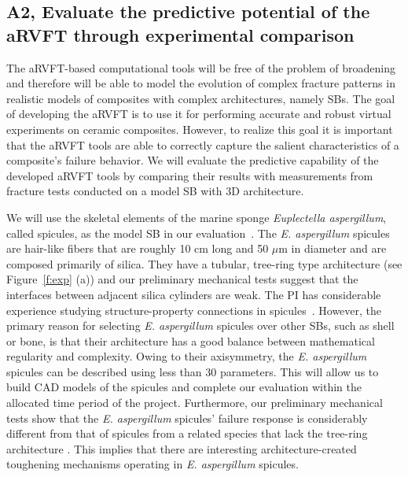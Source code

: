 \documentclass[10pt,letterpaper]{article}
\begin{document}
  \subsection{A2, Evaluate the predictive potential of the aRVFT through experimental comparison}
    \label{s:A2}

    The aRVFT-based computational tools will be free of the problem of broadening and therefore will be able to model the evolution of complex fracture patterns in realistic models of composites with complex architectures, namely SBs.
    The goal of developing the aRVFT is to use it for performing accurate and robust virtual experiments on ceramic composites.
    However, to realize this goal it is important that the aRVFT tools are able to correctly capture the salient characteristics of a composite's failure behavior. We will evaluate the predictive capability of the developed aRVFT tools by comparing their results with measurements from fracture tests conducted on a model SB with 3D architecture.

    We will use the skeletal elements of the marine sponge \textit{Euplectella aspergillum}, called spicules, as the model SB in our evaluation~\cite{mayer2004lessons,sarikaya2001biomimetic}.
    The \textit{E. aspergillum} spicules are hair-like fibers that are roughly 10 cm long and 50 $\mu$m in diameter and are composed primarily of silica.
    They have a tubular, tree-ring type architecture (see Figure~\ref{f:exp} (a)) and our preliminary mechanical tests suggest that the interfaces between adjacent silica cylinders are weak.
    The PI has considerable experience studying structure-property connections in spicules~\cite{monn2015new,monn2017enhanced,monn2017new}.
    However, the primary reason for selecting \textit{E. aspergillum} spicules over other SBs, such as shell or bone, is that their architecture has a good balance between mathematical regularity and complexity.
     Owing to their axisymmetry, the \textit{E. aspergillum} spicules can be described using less than 30 parameters.
    This will allow us to build CAD models of the spicules and complete our evaluation within the allocated time period of the project.
    Furthermore, our preliminary mechanical tests show that the \textit{E. aspergillum} spicules' failure response is considerably different from that of spicules from a related species that lack the tree-ring architecture \cite{monn2017enhanced}.
    This implies that there are interesting architecture-created toughening mechanisms operating in \textit{E. aspergillum} spicules.
\end{document}
